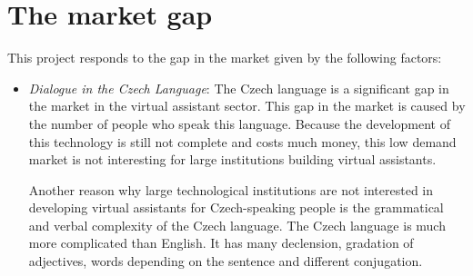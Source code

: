 \section{The market gap}

This project responds to the gap in the market given by the following factors:

\begin{itemize}
    \item \textit{Dialogue in the Czech Language}:
    The Czech language is a significant gap in the market in the virtual assistant sector. This gap in the market is caused by the number of people who speak this language. Because the development of this technology is still not complete and costs much money, this low demand market is not interesting for large institutions building virtual assistants.

    Another reason why large technological institutions are not interested in developing virtual assistants for Czech-speaking people is the grammatical and verbal complexity of the Czech language. The Czech language is much more complicated than English. It has many declension, gradation of adjectives, words depending on the sentence and different conjugation.


\end{itemize}
